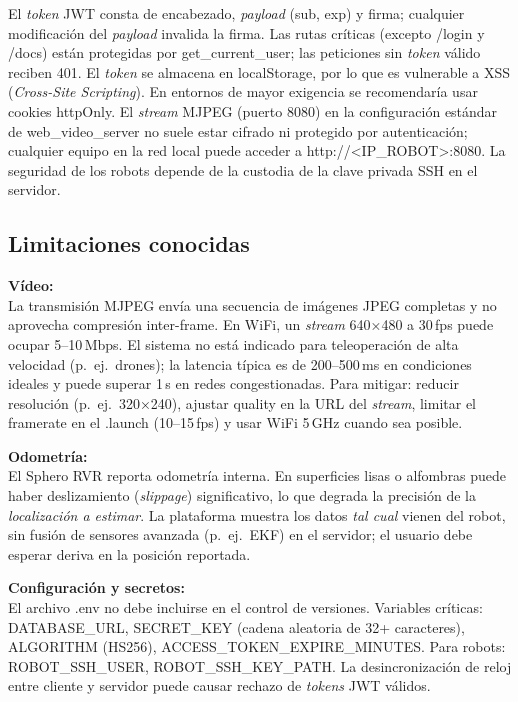 \documentclass[12pt]{article}
\numberwithin{figure}{section}
\numberwithin{table}{section}
\def\code#1{#1}%
\def\file#1{#1}%
\newcommand{\code}[1]{\textcolor{codeblue}{\url{#1}}}
\newcommand{\file}[1]{\textcolor{darkblue}{\texttt{#1}}}
\begin{document}
El \textit{token} JWT consta de encabezado, \textit{payload} (\code{sub}, \code{exp}) y firma; cualquier modificación del \textit{payload} invalida la firma. Las rutas críticas (excepto \code{/login} y \code{/docs}) están protegidas por \code{get\_current\_user}; las peticiones sin \textit{token} válido reciben 401. El \textit{token} se almacena en \code{localStorage}, por lo que es vulnerable a XSS (\textit{Cross-Site Scripting}). En entornos de mayor exigencia se recomendaría usar cookies \code{httpOnly}. El \textit{stream} MJPEG (puerto 8080) en la configuración estándar de \code{web\_video\_server} no suele estar cifrado ni protegido por autenticación; cualquier equipo en la red local puede acceder a \code{http://<IP\_ROBOT>:8080}. La seguridad de los robots depende de la custodia de la clave privada SSH en el servidor.


\subsection{Limitaciones conocidas}

\begin{warningbox}
\textbf{Vídeo:}\\
La transmisión MJPEG envía una secuencia de imágenes JPEG completas y no aprovecha compresión inter-frame. En WiFi, un \textit{stream} 640×480 a 30\,fps puede ocupar 5--10\,Mbps. El sistema no está indicado para teleoperación de alta velocidad (p.\ ej.\ drones); la latencia típica es de 200--500\,ms en condiciones ideales y puede superar 1\,s en redes congestionadas. Para mitigar: reducir resolución (p.\ ej.\ 320×240), ajustar \code{quality} en la URL del \textit{stream}, limitar el framerate en el \file{.launch} (10--15\,fps) y usar WiFi 5\,GHz cuando sea posible.
\end{warningbox}

\begin{warningbox}
\textbf{Odometría:}\\
El Sphero RVR reporta odometría interna. En superficies lisas o alfombras puede haber deslizamiento (\textit{slippage}) significativo, lo que degrada la precisión de la \emph{localización a estimar}. La plataforma muestra los datos \emph{tal cual} vienen del robot, sin fusión de sensores avanzada (p.\ ej.\ EKF) en el servidor; el usuario debe esperar deriva en la posición reportada.
\end{warningbox}

\begin{tipbox}
\textbf{Configuración y secretos:}\\
El archivo \file{.env} no debe incluirse en el control de versiones. Variables críticas: \code{DATABASE\_URL}, \code{SECRET\_KEY} (cadena aleatoria de 32+ caracteres), \code{ALGORITHM} (HS256), \code{ACCESS\_TOKEN\_EXPIRE\_MINUTES}. Para robots: \code{ROBOT\_SSH\_USER}, \code{ROBOT\_SSH\_KEY\_PATH}. La desincronización de reloj entre cliente y servidor puede causar rechazo de \textit{tokens} JWT válidos.
\end{tipbox}
\end{document}

